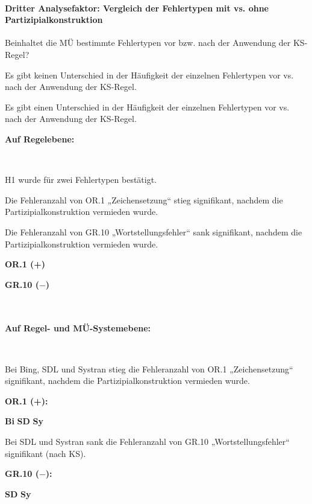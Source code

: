 \paragraph*{Dritter Analysefaktor: Vergleich der Fehlertypen mit vs. ohne Partizipialkonstruktion}
\begin{description}[font=\normalfont\bfseries]
\item [Fragestellung:] Beinhaltet die MÜ bestimmte Fehlertypen vor bzw. nach der Anwendung der KS-Regel?
\item [H0 --] Es gibt keinen Unterschied in der Häufigkeit der einzelnen Fehlertypen vor vs. nach der Anwendung der KS-Regel.
\item [H1 --] Es gibt einen Unterschied in der Häufigkeit der einzelnen Fehlertypen vor vs. nach der Anwendung der KS-Regel.
\end{description}
\noindent
\parbox[t]{.8\textwidth}{\textbf{Auf Regelebene:}}\\
\parbox[t]{.8\textwidth}{
H1 wurde für zwei Fehlertypen bestätigt.

Die Fehleranzahl von OR.1 „Zeichensetzung“ stieg signifikant, nachdem die Partizipialkonstruktion vermieden wurde.

Die Fehleranzahl von GR.10 „Wortstellungsfehler“ sank signifikant, nachdem die Partizipialkonstruktion vermieden wurde.
}
\parbox[t]{.04\textwidth}{}
\colorbox{smGreen}{\parbox[t]{.15\textwidth}{
{\textbf{OR.1 (+)}}

\textbf{GR.10 ($-$)}\\
\\
\\
}}

\noindent
\parbox[t]{.8\textwidth}{\textbf{Auf Regel- und MÜ-Systemebene:}}\\
\parbox[t]{.8\textwidth}{
Bei Bing, SDL und Systran stieg die Fehleranzahl von OR.1 „Zeichensetzung“ signifikant, nachdem die Partizipialkonstruktion vermieden wurde.
}
\parbox[t]{.04\textwidth}{}
\colorbox{smGreen}{\parbox[t]{.15\textwidth}{
{ \textbf{OR.1 (+):}}

{ \textbf{Bi}}{ \textbf{SD}} \textbf{Sy}\\
}}

\medskip
\noindent
\parbox[t]{.8\textwidth}{
Bei SDL und Systran sank die Fehleranzahl von GR.10 „Wortstellungsfehler“ signifikant (nach KS).
}
\parbox[t]{.04\textwidth}{}
\colorbox{smGreen}{\parbox[t]{.15\textwidth}{
{ \textbf{GR.10 ($-$):}}

{ \textbf{SD}} \textbf{Sy}
}}

